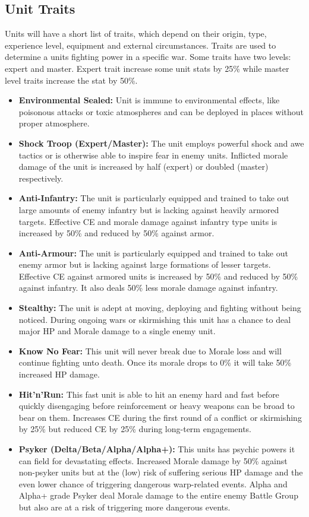 \subsection{Unit Traits}
Units will have a short list of traits, which depend on their origin, type, experience level, equipment and external circumstances.
Traits are used to determine a units fighting power in a specific war. Some traits have two levels: expert and master. Expert trait increase some unit stats by 25\% while master level traits increase the stat by 50\%.
\begin{itemize}
	\item \textbf{Environmental Sealed:} Unit is immune to environmental effects, like poisonous attacks or toxic atmospheres and can be deployed in places without proper atmosphere.
	\item \textbf{Shock Troop (Expert/Master):} The unit employs powerful shock and awe tactics or is otherwise able to inspire fear in enemy units. Inflicted morale damage of the unit is increased by half (expert) or doubled (master) respectively.
	\item \textbf{Anti-Infantry:} The unit is particularly equipped and trained to take out large amounts of enemy infantry but is lacking against heavily armored targets. Effective CE and morale damage against infantry type units is increased by 50\% and reduced by 50\% against armor.
	\item \textbf{Anti-Armour:} The unit is particularly equipped and trained to take out enemy armor but is lacking against large formations of lesser targets. Effective CE against armored units is increased by 50\% and reduced by 50\% against infantry. It also deals 50\% less morale damage against infantry.
	\item \textbf{Stealthy:} The unit is adept at moving, deploying and fighting without being noticed. During ongoing wars or skirmishing this unit has a chance to deal major HP and Morale damage to a single enemy unit.
	\item \textbf{Know No Fear:} This unit will never break due to Morale loss and will continue fighting unto death. Once its morale drops to 0\% it will take 50\% increased HP damage.
	\item \textbf{Hit'n'Run:} This fast unit is able to hit an enemy hard and fast before quickly disengaging before reinforcement or heavy weapons can be broad to bear on them. Increases CE during the first round of a conflict or skirmishing by 25\% but reduced CE by 25\% during long-term engagements.
 	\item \textbf{Psyker (Delta/Beta/Alpha/Alpha+):} This units has psychic powers it can field for devastating effects. Increased Morale damage by 50\% against non-psyker units but at the (low) risk of suffering serious HP damage and the even lower chance of triggering dangerous warp-related events. Alpha and Alpha+ grade Psyker deal Morale damage to the entire enemy Battle Group but also are at a risk of triggering more dangerous events.

\end{itemize}
